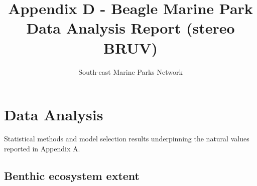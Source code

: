 \documentclass[
  letterpaper,
  DIV=11,
  numbers=noendperiod]{scrartcl}
\title{Appendix D - Beagle Marine Park Data Analysis Report (stereo
BRUV)}
\subtitle{South-east Marine Parks Network}
\author{}
\date{}
\renewcommand*\contentsname{Table of contents}
\newcommand\contentsname{Table of contents}
\begin{document}
\maketitle

\renewcommand*\contentsname{Table of contents}
{
\setcounter{tocdepth}{3}
\tableofcontents
}

\section{Data Analysis}\label{data-analysis}

Statistical methods and model selection results underpinning the natural
values reported in Appendix A.

\newpage{}

\subsection{Benthic ecosystem extent}\label{benthic-ecosystem-extent}

\begingroup\fontsize{10}{12}\selectfont
\end{document}
